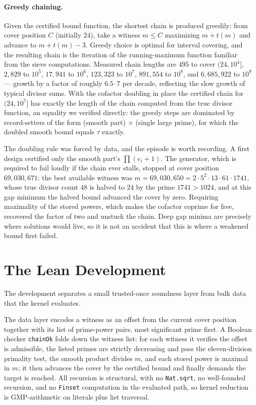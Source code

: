 \documentclass[11pt]{article}
\newcommand{\tdiv}{\tau}
\newcommand{\lean}[1]{\texttt{#1}}
\begin{document}
\paragraph{Greedy chaining.}
Given the certified bound function, the shortest chain is produced
greedily: from cover position $C$ (initially $24$), take a witness
$m \le C$ maximizing $m + t(m)$ and advance to $m + t(m) - 3$. Greedy
choice is optimal for interval covering, and the resulting chain is the
iteration of the running-maximum function familiar from the sieve
computations. Measured chain lengths are $495$ to cover $(24, 10^4]$,
$2{,}829$ to $10^5$, $17{,}941$ to $10^6$, $123{,}323$ to $10^7$,
$891{,}554$ to $10^8$, and $6{,}685{,}922$ to $10^9$ --- growth by a
factor of roughly $6.5$--$7$ per decade, reflecting the slow growth of
typical divisor sums. With the cofactor doubling in place the certified
chain for $(24, 10^7]$ has exactly the length of the chain computed
from the true divisor function, an equality we verified directly: the
greedy steps are dominated by record-setters of the form (smooth part)
$\times$ (single large prime), for which the doubled smooth bound
equals $\tdiv$ exactly.

The doubling rule was forced by data, and the episode is worth
recording. A first design certified only the smooth part's
$\prod (e_i + 1)$. The generator, which is required to fail loudly if
the chain ever stalls, stopped at cover position $69{,}030{,}671$: the
best available witness was
$m = 69{,}030{,}650 = 2 \cdot 5^2 \cdot 13 \cdot 61 \cdot 1741$, whose
true divisor count $48$ is halved to $24$ by the prime $1741 > 1024$,
and at this gap minimum the halved bound advanced the cover by zero.
Requiring maximality of the stored powers, which makes the cofactor
coprime for free, recovered the factor of two and unstuck the chain.
Deep gap minima are precisely where solutions would live, so it is not
an accident that this is where a weakened bound first failed.

\section{The Lean Development}\label{sec:lean}

The development separates a small trusted-once soundness layer from
bulk data that the kernel evaluates.

The data layer encodes a witness as an offset from the current cover
position together with its list of prime-power pairs, most significant
prime first. A Boolean checker \lean{chainOk} folds down the witness
list: for each witness it verifies the offset is admissible, the listed
primes are strictly decreasing and pass the eleven-division primality
test, the smooth product divides $m$, and each stored power is maximal
in $m$; it then advances the cover by the certified bound and finally
demands the target is reached. All recursion is structural, with no
\lean{Nat.sqrt}, no well-founded recursion, and no \lean{Finset}
computation in the evaluated path, so kernel reduction is
GMP-arithmetic on literals plus list traversal.
\end{document}
